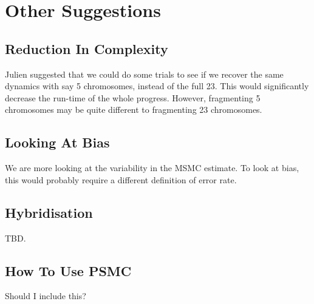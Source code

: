 \documentclass[11pt,a4paper]{article}
\begin{document}
\section{Other Suggestions}
\subsection{Reduction In Complexity}
Julien suggested that we could do some trials to see if we recover the same dynamics with say 5 chromosomes, instead of the full 23. This would significantly decrease the run-time of the whole progress. However, fragmenting 5 chromosomes may be quite different to fragmenting 23 chromosomes.

\subsection{Looking At Bias}
We are more looking at the variability in the MSMC estimate. To look at bias, this would probably require a different definition of error rate.

\subsection{Hybridisation}
TBD.

\subsection{How To Use PSMC}
Should I include this?


{}
\end{document}
